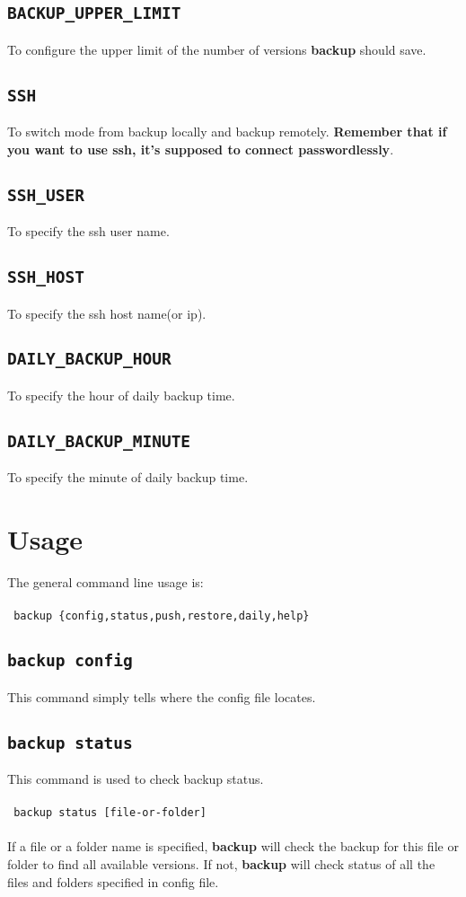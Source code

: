 \documentclass[a4paper]{article}
\begin{document}
\subsection{{\large\tt BACKUP\_UPPER\_LIMIT}}
To configure the upper limit of the number of versions \textbf{backup} should save.

\subsection{{\large\tt SSH}}
To switch mode from backup locally and backup remotely. \textbf{Remember that if you want to use ssh, it's supposed to connect passwordlessly}.

\subsection{{\large\tt SSH\_USER}}
To specify the ssh user name.

\subsection{{\large\tt SSH\_HOST}}
To specify the ssh host name(or ip).

\subsection{{\large\tt DAILY\_BACKUP\_HOUR}}
To specify the hour of daily backup time.

\subsection{{\large\tt DAILY\_BACKUP\_MINUTE}}
To specify the minute of daily backup time.

\section{Usage}
The general command line usage is: \\
\\
{\tt
    backup \{config,status,push,restore,daily,help\}
}

\subsection{{\large\tt backup config}}
This command simply tells where the config file locates.

\subsection{{\large\tt backup status}}
This command is used to check backup status. \\
\\
{\tt
    backup status [file-or-folder]
} \\
\\
If a file or a folder name is specified, \textbf{backup} will check the backup for this file or folder to find all available versions. If not, \textbf{backup} will check status of all the files and folders specified in config file.
\end{document}
